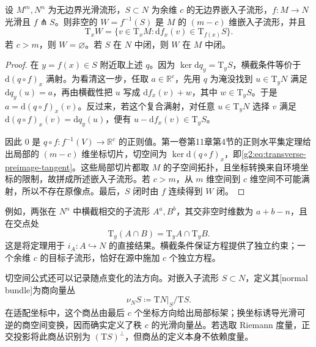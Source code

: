 \begin{theorem}[横截逆像]\label{g2:thm:transverse-preimage}
	设 \(M^m,N^n\) 为无边界光滑流形，\(S\subset N\) 为余维 \(c\) 的无边界嵌入子流形，\(f:M\to N\) 光滑且 \(f\pitchfork S\)。则非空的 \(W=f^{-1}(S)\) 是 \(M\) 的 \((m-c)\) 维嵌入子流形，并且
	\begin{equation}\label{g2:eq:transverse-preimage-tangent}
		\mathrm{T}_xW=\{v\in\mathrm{T}_xM:\mathrm{d}f_x(v)\in\mathrm{T}_{f(x)}S\}.
	\end{equation}
	若 \(c>m\)，则 \(W=\varnothing\)。若 \(S\) 在 \(N\) 中闭，则 \(W\) 在 \(M\) 中闭。
\end{theorem}
\begin{proof}
	在 \(y=f(x)\in S\) 附近取上述 \(q\)。因为 \(\ker\mathrm{d}q_y=\mathrm{T}_yS\)，横截条件等价于 \(\mathrm{d}(q\circ f)_x\) 满射。为看清这一步，任取 \(a\in\mathbb R^c\)，先用 \(q\) 为淹没找到 \(u\in\mathrm{T}_yN\) 满足 \(\mathrm{d}q_y(u)=a\)，再由横截性把 \(u\) 写成 \(\mathrm{d}f_x(v)+w\)，其中 \(w\in\mathrm{T}_yS\)。于是 \(a=\mathrm{d}(q\circ f)_x(v)\)。反过来，若这个复合满射，对任意 \(u\in\mathrm{T}_yN\) 选择 \(v\) 满足 \(\mathrm{d}(q\circ f)_x(v)=\mathrm{d}q_y(u)\)，便有 \(u-\mathrm{d}f_x(v)\in\mathrm{T}_yS\)。

	因此 \(0\) 是 \(q\circ f:f^{-1}(V)\to\mathbb R^c\) 的正则值。第一卷第11章第4节的正则水平集定理给出局部的 \((m-c)\) 维坐标切片，切空间为 \(\ker\mathrm{d}(q\circ f)_x\)，即\eqref{g2:eq:transverse-preimage-tangent}。这些局部切片都取 \(M\) 的子空间拓扑，且坐标转换来自环境坐标的限制，故拼成所述嵌入子流形。若 \(c>m\)，从 \(m\) 维空间到 \(c\) 维空间不可能满射，所以不存在原像点。最后，\(S\) 闭时由 \(f\) 连续得到 \(W\) 闭。
\end{proof}

例如，两张在 \(N^n\) 中横截相交的子流形 \(A^a,B^b\)，其交非空时维数为 \(a+b-n\)，且在交点处
\[
	\mathrm{T}_y(A\cap B)=\mathrm{T}_yA\cap\mathrm{T}_yB.
\]
这是将定理用于 \(i_A:A\hookrightarrow N\) 的直接结果。横截条件保证方程提供了独立约束；一个余维 \(c\) 的目标子流形，恰好在源中施加 \(c\) 个独立方程。

\ProseParagraphBreak

切空间公式还可以记录随点变化的法方向。对嵌入子流形 \(S\subset N\)，定义其[normal bundle]为商向量丛
\[
	\nu_N S\coloneqq\mathrm{T}N|_S/\mathrm{T}S.
\]
在适配坐标中，这个商丛由最后 \(c\) 个坐标方向给出局部标架；换坐标诱导光滑可逆的商空间变换，因而确实定义了秩 \(c\) 的光滑向量丛。若选取 Riemann 度量，正交投影将此商丛识别为 \((\mathrm{T}S)^\perp\)，但商丛的定义本身不依赖度量。

